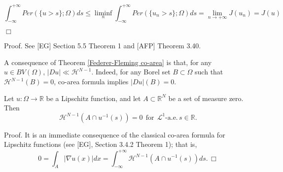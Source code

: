 \[ \int_{-\infty}^{+\infty} Per(\{u > s\}; \Omega) ds \le \liminf\limits_{n} \int_{-\infty}^{+\infty} Per(\{u_{n} > s\}; \Omega) ds = \lim_{n \to +\infty} J(u_{n}) = J(u) \]

$\Box$

Proof. See [EG] Section 5.5 Theorem 1 and [AFP] Theorem 3.40.

\begin{remark} \label{BVabscont} A consequence of Theorem \ref{Federer-Fleming co-area} is that, for any $u \in BV(\Omega)$, $|Du| \ll \mathcal{H}^{N - 1}$. Indeed, for any Borel set $B \subset \Omega$ such that $\mathcal{H}^{N - 1}(B) = 0$, co-area formula implies $|Du|(B) = 0$.
\end{remark}

\begin{lemma} \label{nullcoarea} Let $u : \Omega \to \mathbb{R}$ be a Lipschitz function, and let $A \subset \mathbb{R}^{N}$ be a set of measure zero.
\\
Then 
\[ \mathcal{H}^{N-1}(A \cap u^{-1}(s) ) = 0 \  \ \text{for} \ \ \mathcal{L}^{1}\text{-a.e.} \, s \in \mathbb{R}. \]
\end{lemma}

Proof. It is an immediate consequence of the classical co-area formula for Lipschitz functions (see [EG], Section 3.4.2 Theorem 1); that is,
\[ 0 = \int_{A} |\nabla u(x)| dx = \int_{-\infty}^{+\infty} \mathcal{H}^{N-1}(A \cap u^{-1}(s)) ds. \, \Box \]